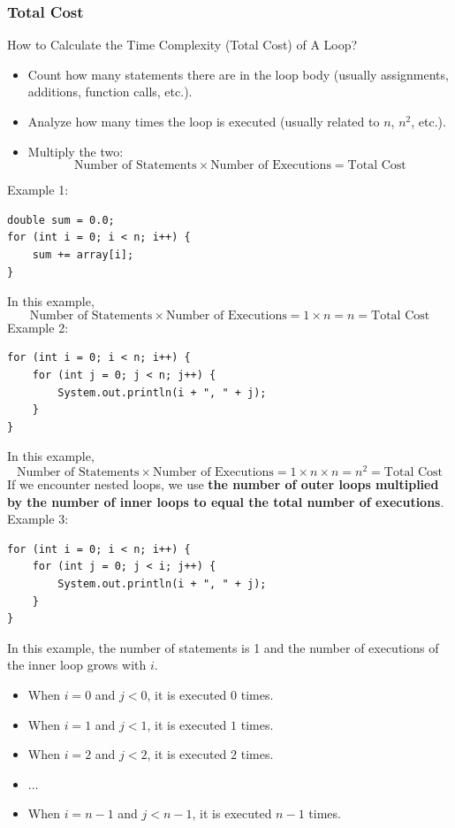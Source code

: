 \documentclass[letterpaper,12pt]{article}
\begin{document}
\subsubsection{Total Cost}
How to Calculate the Time Complexity (Total Cost) of A Loop?
\begin{itemize}
    \item Count how many statements there are in the loop body (usually assignments, additions, function calls, etc.).
    \item Analyze how many times the loop is executed (usually related to $n$, $n^2$, etc.).
    \item Multiply the two: $$\text{Number of Statements} \times \text{Number of Executions} =\text{Total Cost}$$
\end{itemize}
Example 1:
\begin{verbatim}
double sum = 0.0;
for (int i = 0; i < n; i++) {
    sum += array[i];
}
\end{verbatim}
In this example,
$$\text{Number of Statements} \times \text{Number of Executions} = 1 \times n = n = \text{Total Cost}$$
Example 2:
\begin{verbatim}
for (int i = 0; i < n; i++) {
    for (int j = 0; j < n; j++) {
        System.out.println(i + ", " + j);
    }
}
\end{verbatim}
In this example,
$$\text{Number of Statements} \times \text{Number of Executions} = 1 \times n \times n = n^2 = \text{Total Cost}$$
If we encounter nested loops, we use \textbf{the number of outer loops multiplied by the number of inner loops to equal the total number of executions}.\\
Example 3:
\begin{verbatim}
for (int i = 0; i < n; i++) {
    for (int j = 0; j < i; j++) {
        System.out.println(i + ", " + j);
    }
}
\end{verbatim}
In this example, the number of statements is 1 and the number of executions of the inner loop grows with $i$.
\begin{itemize}
    \item When $i = 0$ and $j < 0$, it is executed $0$ times.
    \item When $i = 1$ and $j < 1$, it is executed $1$ times.
    \item When $i = 2$ and $j < 2$, it is executed $2$ times.
    \item ...
    \item When $i = n-1$ and $j < n-1$, it is executed $n-1$ times.
\end{itemize}
\end{document}
